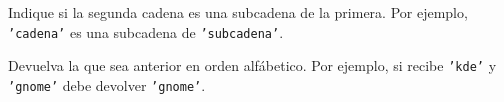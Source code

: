 \begin{partes}
\item Indique si la segunda cadena es una subcadena de la primera. Por ejemplo,
\texttt{'cadena'} es una subcadena de \texttt{'subcadena'}.
\item Devuelva la que sea anterior en orden alfábetico. Por ejemplo, si recibe
\texttt{'kde'} y \texttt{'gnome'} debe devolver \texttt{'gnome'}.
\end{partes}




